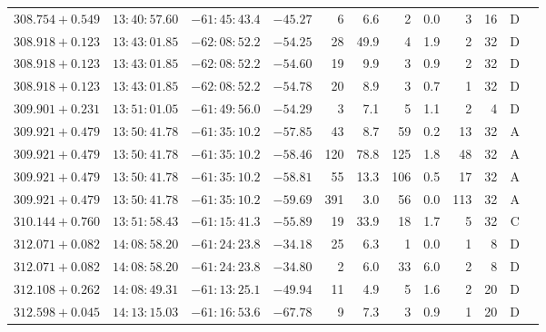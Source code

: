 {\begin{longtable}{c rrr rrrrr rr c}
    $308.754+0.549$     &   $13:40:57.60$     &   $-61:45:43.4$     &   $-45.27  $    &   6      &    6.6    &    2   &   0.0 &   3   &   16  &   D   \\
    $308.918+0.123$     &   $13:43:01.85$     &   $-62:08:52.2$     &   $-54.25  $    &   28     &   49.9    &    4   &   1.9 &   2   &   32  &   D   \\
    $308.918+0.123$     &   $13:43:01.85$     &   $-62:08:52.2$     &   $-54.60  $    &   19     &    9.9    &    3   &   0.9 &   2   &   32  &   D   \\
    $308.918+0.123$     &   $13:43:01.85$     &   $-62:08:52.2$     &   $-54.78  $    &   20     &    8.9    &    3   &   0.7 &   1   &   32  &   D   \\
    $309.901+0.231$     &   $13:51:01.05$     &   $-61:49:56.0$     &   $-54.29  $    &   3      &    7.1    &    5   &   1.1 &   2   &   4   &   D   \\
    $309.921+0.479$     &   $13:50:41.78$     &   $-61:35:10.2$     &   $-57.85  $    &   43     &    8.7    &    59  &   0.2 &   13  &   32  &   A   \\
    $309.921+0.479$     &   $13:50:41.78$     &   $-61:35:10.2$     &   $-58.46  $    &   120    &   78.8    &    125 &   1.8 &   48  &   32  &   A   \\
    $309.921+0.479$     &   $13:50:41.78$     &   $-61:35:10.2$     &   $-58.81  $    &   55     &   13.3    &    106 &   0.5 &   17  &   32  &   A   \\
    $309.921+0.479$     &   $13:50:41.78$     &   $-61:35:10.2$     &   $-59.69  $    &   391    &    3.0    &    56  &   0.0 &   113 &   32  &   A   \\
    $310.144+0.760$     &   $13:51:58.43$     &   $-61:15:41.3$     &   $-55.89  $    &   19     &   33.9    &    18  &   1.7 &   5   &   32  &   C   \\
    $312.071+0.082$     &   $14:08:58.20$     &   $-61:24:23.8$     &   $-34.18  $    &   25     &    6.3    &    1   &   0.0 &   1   &   8   &   D   \\
    $312.071+0.082$     &   $14:08:58.20$     &   $-61:24:23.8$     &   $-34.80  $    &   2      &    6.0    &    33  &   6.0 &   2   &   8   &   D   \\
    $312.108+0.262$     &   $14:08:49.31$     &   $-61:13:25.1$     &   $-49.94  $    &   11     &    4.9    &    5   &   1.6 &   2   &   20  &   D   \\
    $312.598+0.045$     &   $14:13:15.03$     &   $-61:16:53.6$     &   $-67.78  $    &   9      &    7.3    &    3   &   0.9 &   1   &   20  &   D   \\

\end{longtable}}
